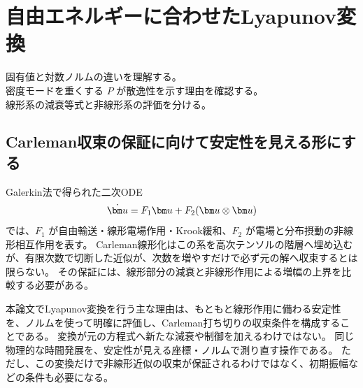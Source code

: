 \chapter{自由エネルギーに合わせたLyapunov変換}
\begin{chaptergoal}
\cgitem 固有値と対数ノルムの違いを理解する。\\
\cgitem 密度モードを重くする $P$ が散逸性を示す理由を確認する。\\
\cgitem 線形系の減衰等式と非線形系の評価を分ける。
\end{chaptergoal}

\section{Carleman収束の保証に向けて安定性を見える形にする}
Galerkin法で得られた二次ODE
\[
\dot\uu=F_1\uu+F_2(\uu\otimes\uu)
\]
では、$F_1$ が自由輸送・線形電場作用・Krook緩和、$F_2$ が電場と分布摂動の非線形相互作用を表す。
Carleman線形化はこの系を高次テンソルの階層へ埋め込むが、有限次数で切断した近似が、次数を増やすだけで必ず元の解へ収束するとは限らない。
その保証には、線形部分の減衰と非線形作用による増幅の上界を比較する必要がある。

本論文でLyapunov変換を行う主な理由は、もともと線形作用に備わる安定性を、ノルムを使って明確に評価し、Carleman打ち切りの収束条件を構成することである。
変換が元の方程式へ新たな減衰や制御を加えるわけではない。
同じ物理的な時間発展を、安定性が見える座標・ノルムで測り直す操作である。
ただし、この変換だけで非線形近似の収束が保証されるわけではなく、初期振幅などの条件も必要になる。

